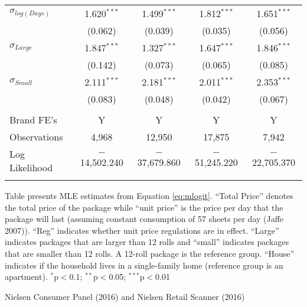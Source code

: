 \begin{table}[!htbp]
\begin{tabular}{@{\extracolsep{5pt}}lcccc}
     $\sigma_{log(Days)}$ & 1.620$^{***}$ & 1.499$^{***}$ & 1.812$^{***}$ & 1.651$^{***}$ \\
                        & (0.062)       & (0.039)       & (0.035)         & (0.056) \\
     $\sigma_{Large}$ & 1.847$^{***}$ & 1.327$^{***}$ & 1.647$^{***}$ & 1.846$^{***}$ \\
                      & (0.142)         & (0.073)     & (0.065)       & (0.085) \\
     $\sigma_{Small}$ & 2.111$^{***}$ & 2.181$^{***}$ & 2.011$^{***}$ & 2.353$^{***}$ \\
                    & (0.083)         & (0.048)       & (0.042)       & (0.067) \\
 \hline \\[-1.8ex]

Brand FE's & Y & Y & Y & Y \\
Observations & 4,968 & 12,950 & 17,875 & 7,942 \\
Log Likelihood & $-$14,502.240 & $-$37,679.860 & $-$51,245.220 & $-$22,705.370 \\
\hline
\hline \\[-1.8ex]
\end{tabular}
\begin{tablenotes}
Table presents MLE estimates from Equation \ref{eq:mlogit}. ``Total Price'' denotes the total price of the package while ``unit price'' is the price per day that the package will last (assuming constant consumption of 57 sheets per day (Jaffe 2007)). ``Reg'' indicates whether unit price regulations are in effect. ``Large'' indicates packages that are larger than 12 rolls and ``small'' indicates packages that are smaller than 12 rolls. A 12-roll package is the reference group. ``House'' indicates if the household lives in a single-family home (reference group is an apartment). $^{*}$p$<$0.1; $^{**}$p$<$0.05; $^{***}$p$<$0.01
\end{tablenotes}
\begin{tablenotes}[Source]
Nielsen Consumer Panel (2016) and Nielsen Retail Scanner (2016)
\end{tablenotes}
\end{table}
